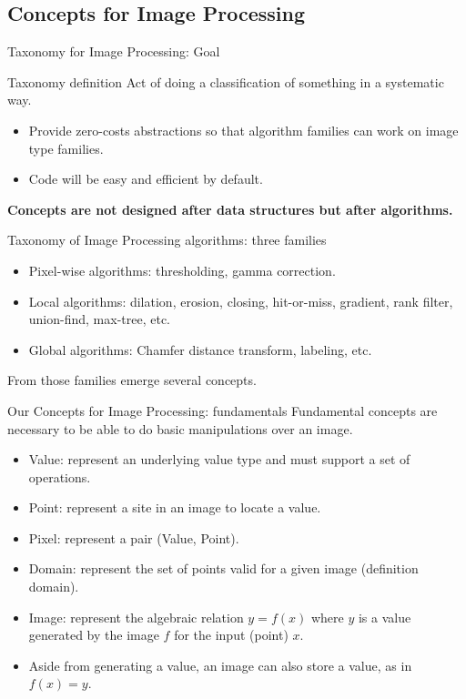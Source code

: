 \documentclass[12pt,aspectratio=169]{beamer}
\begin{document}
\subsection{Concepts for Image Processing}

\begin{frame}{Taxonomy for Image Processing: Goal}
  \begin{alertblock}{Taxonomy definition}
    Act of doing a classification of something in a systematic way.
  \end{alertblock}
  \begin{itemize}
    \item Provide zero-costs abstractions so that algorithm families can work on image type families.
    \item Code will be easy and efficient by default.
  \end{itemize}
  \begin{center}
    \textbf{Concepts are not designed after data structures but after algorithms.}
  \end{center}
\end{frame}

\begin{frame}[fragile]{Taxonomy of Image Processing algorithms: three families}
  \begin{itemize}
    \item Pixel-wise algorithms: thresholding, gamma correction.
    \item Local algorithms: dilation, erosion, closing, hit-or-miss, gradient, rank filter, union-find, max-tree, etc.
    \item Global algorithms: Chamfer distance transform, labeling, etc.
  \end{itemize}
  From those families emerge several concepts.
\end{frame}

\begin{frame}[fragile]{Our Concepts for Image Processing: fundamentals}
  Fundamental concepts are necessary to be able to do basic manipulations over an image.
  \begin{itemize}
    \item Value: represent an underlying value type and must support a set of operations.
    \item Point: represent a site in an image to locate a value.
    \item Pixel: represent a pair (Value, Point).
    \item Domain: represent the set of points valid for a given image (definition domain).
    \item Image: represent the algebraic relation \(y = f(x)\) where \(y\) is a value generated by the image \(f\) for
          the input (point) \(x\).
    \item Aside from generating a value, an image can also store a value, as in \(f(x) = y\).
  \end{itemize}
\end{frame}
\end{document}
